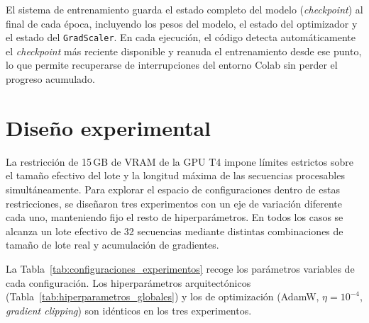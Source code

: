 El sistema de entrenamiento guarda el estado completo del modelo
(\textit{checkpoint}) al final de cada época, incluyendo los pesos del
modelo, el estado del optimizador y el estado del \texttt{GradScaler}.
En cada ejecución, el código detecta automáticamente el \textit{checkpoint}
más reciente disponible y reanuda el entrenamiento desde ese punto,
lo que permite recuperarse de interrupciones del entorno Colab sin perder
el progreso acumulado.

\section{Diseño experimental}
\label{sec:diseno_experimental}

La restricción de 15\,GB de VRAM de la GPU T4 impone límites estrictos
sobre el tamaño efectivo del lote y la longitud máxima de las secuencias
procesables simultáneamente. Para explorar el espacio de configuraciones
dentro de estas restricciones, se diseñaron tres experimentos con un eje
de variación diferente cada uno, manteniendo fijo el resto de
hiperparámetros. En todos los casos se alcanza un lote efectivo de 32
secuencias mediante distintas combinaciones de tamaño de lote real y
acumulación de gradientes.

La Tabla~\ref{tab:configuraciones_experimentos} recoge los parámetros
variables de cada configuración. Los hiperparámetros arquitectónicos
(Tabla~\ref{tab:hiperparametros_globales}) y los de optimización
(AdamW, $\eta = 10^{-4}$, \textit{gradient clipping}) son idénticos
en los tres experimentos.

